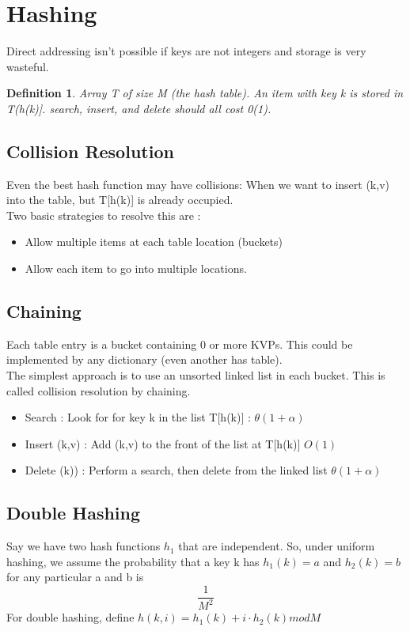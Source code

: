 \documentclass{article}
\newtheorem{definition}[theorem]{Definition}
\begin{document}
\section{Hashing}
Direct addressing isn't possible if keys are not integers and storage is very wasteful. 

\begin{definition}
Array T of size M (the hash table). An item with key k is stored in T(h(k)]. search, insert, and delete should all cost 0(1). 
\end{definition}

\subsection*{Collision Resolution}
Even the best hash function may have collisions: 
When we want to insert (k,v) into the table, but T[h(k)] is already occupied. \\
Two basic  strategies to resolve this are : 
\begin{itemize}
\item Allow multiple items at each table location (buckets)
\item Allow each item to go into multiple locations. 
\end{itemize}
\subsection*{Chaining}
Each table entry is a bucket containing 0 or more KVPs. This could be implemented by any dictionary (even another has table). \\
The simplest approach is to use an unsorted linked list in each bucket. This is called collision resolution by chaining. 
\begin{itemize}
\item Search : Look for for key k in the list T[h(k)] : \(\theta(1 + \alpha)\)
\item Insert (k,v) : Add (k,v) to the front of the list at T[h(k)] \(O(1)\)
\item Delete (k)) : Perform a search, then delete from the linked list \(\theta (1  + \alpha)\)
\end{itemize} 

\subsection*{Double Hashing}
Say we have two hash functions \(h_1\) that are independent. 
So, under uniform hashing, we assume the probability that a key k has \(h_1(k) = a\) and \(h_2 (k) = b\) for any particular a and b is 
$$ \frac{1}{M^2}$$
For double hashing, define \(h(k,i) = h_1 (k) + i \cdot h_2(k) mod M \)
\end{document}
